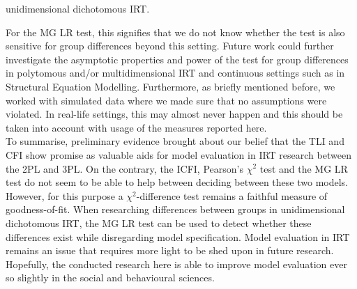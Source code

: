 \documentclass[Royal,sageapa,times,doublespace]{sagej}
\begin{document}
unidimensional dichotomous IRT. %

For the MG LR test, this signifies that we do not know whether the test is also sensitive for group differences beyond this setting. Future work could further investigate the asymptotic properties and power of the test for group differences in polytomous and/or multidimensional IRT and continuous settings such as in Structural Equation Modelling. Furthermore, as briefly mentioned before, we worked with simulated data where we made sure that no assumptions were violated. In real-life settings, this may almost never happen and this should be taken into account with usage of the measures reported here. \\
\indent To summarise, preliminary evidence brought about our belief that the TLI and CFI show promise as valuable aids for model evaluation in IRT research between the 2PL and 3PL. On the contrary, the ICFI, Pearson's $\chi^2$ test and the MG LR test do not seem to be able to help between deciding between these two models. However, for this purpose a $\chi^2$-difference test remains a faithful measure of goodness-of-fit. When researching differences between groups in unidimensional dichotomous IRT, the MG LR test can be used to detect whether these differences exist while disregarding model specification. Model evaluation in IRT remains an issue that requires more light to be shed upon in future research. Hopefully, the conducted research here is able to improve model evaluation ever so slightly in the social and behavioural sciences. 

\newpage

%
%
\end{document}
